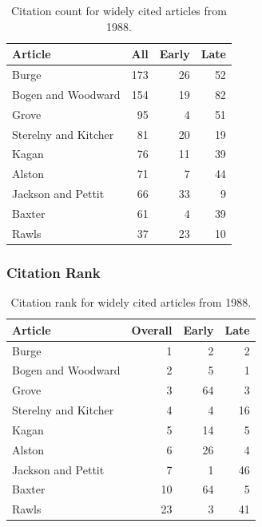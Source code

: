 \documentclass[
  10pt,
  letterpaper,
  DIV=11,
  numbers=noendperiod,
  twoside]{scrartcl}
\begin{document}
\begin{longtable}[]{@{}lrrr@{}}

\caption{\label{tbl-citation-count-1988}Citation count for widely cited
articles from 1988.}

\tabularnewline

\toprule\noalign{}
Article & All & Early & Late \\
\midrule\noalign{}
\endhead
\bottomrule\noalign{}
\endlastfoot
Burge & 173 & 26 & 52 \\
Bogen and Woodward & 154 & 19 & 82 \\
Grove & 95 & 4 & 51 \\
Sterelny and Kitcher & 81 & 20 & 19 \\
Kagan & 76 & 11 & 39 \\
Alston & 71 & 7 & 44 \\
Jackson and Pettit & 66 & 33 & 9 \\
Baxter & 61 & 4 & 39 \\
Rawls & 37 & 23 & 10 \\

\end{longtable}

\subsubsection*{Citation Rank}\label{sec-rank-1988}

\begin{longtable}[]{@{}lrrr@{}}

\caption{\label{tbl-citation-rank-1988}Citation rank for widely cited
articles from 1988.}

\tabularnewline

\toprule\noalign{}
Article & Overall & Early & Late \\
\midrule\noalign{}
\endhead
\bottomrule\noalign{}
\endlastfoot
Burge & 1 & 2 & 2 \\
Bogen and Woodward & 2 & 5 & 1 \\
Grove & 3 & 64 & 3 \\
Sterelny and Kitcher & 4 & 4 & 16 \\
Kagan & 5 & 14 & 5 \\
Alston & 6 & 26 & 4 \\
Jackson and Pettit & 7 & 1 & 46 \\
Baxter & 10 & 64 & 5 \\
Rawls & 23 & 3 & 41 \\

\end{longtable}
\end{document}
